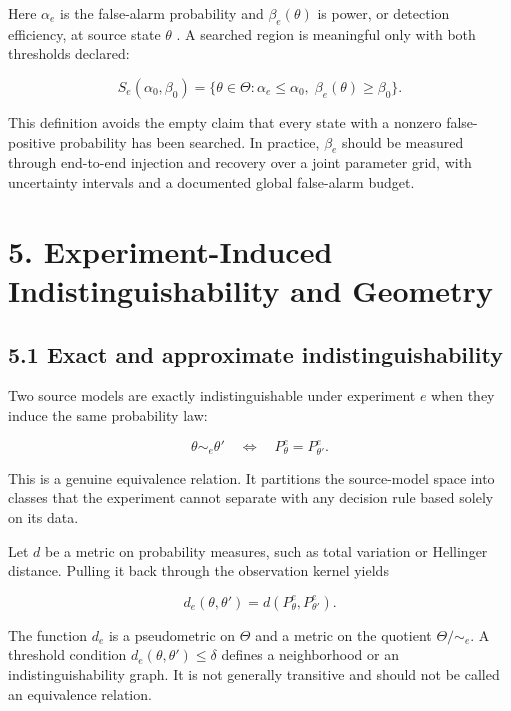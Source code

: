 \documentclass[11pt,a4paper]{article}
\begin{document}
Here \(\alpha_e\) is the false-alarm probability and \(\beta_e(\theta)\) is power, or detection efficiency, at source state \(\theta\) \citep{neymanpearson1933}. A searched region is meaningful only with both thresholds declared:

\begin{equation}
S_e(\alpha_0,\beta_0)
=\{\theta\in\Theta:\alpha_e\le\alpha_0,\;\beta_e(\theta)\ge\beta_0\}.
\end{equation}

This definition avoids the empty claim that every state with a nonzero false-positive probability has been searched. In practice, \(\beta_e\) should be measured through end-to-end injection and recovery over a joint parameter grid, with uncertainty intervals and a documented global false-alarm budget.

\section{5. Experiment-Induced Indistinguishability and Geometry}\label{5-experiment-induced-indistinguishability-and-geometry}

\subsection{5.1 Exact and approximate indistinguishability}\label{51-exact-and-approximate-indistinguishability}

Two source models are exactly indistinguishable under experiment \(e\) when they induce the same probability law:

\begin{equation}
\theta\sim_e\theta' \quad\Longleftrightarrow\quad P^e_\theta=P^e_{\theta'}.
\end{equation}

This is a genuine equivalence relation. It partitions the source-model space into classes that the experiment cannot separate with any decision rule based solely on its data.

Let \(d\) be a metric on probability measures, such as total variation or Hellinger distance. Pulling it back through the observation kernel yields

\begin{equation}
d_e(\theta,\theta')=d(P^e_\theta,P^e_{\theta'}).
\end{equation}

The function \(d_e\) is a pseudometric on \(\Theta\) and a metric on the quotient \(\Theta/{\sim_e}\). A threshold condition \(d_e(\theta,\theta')\le\delta\) defines a neighborhood or an indistinguishability graph. It is not generally transitive and should not be called an equivalence relation.
\end{document}
